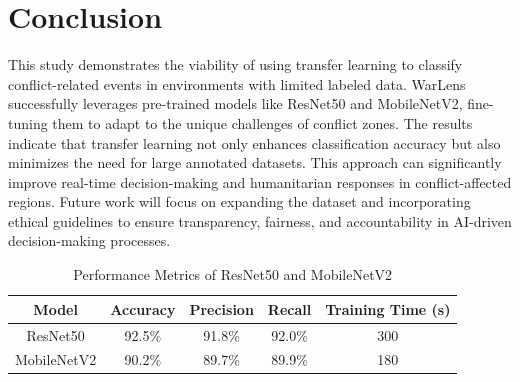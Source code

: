 \documentclass[conference]{IEEEtran}
\begin{document}
\section{Conclusion}
This study demonstrates the viability of using transfer learning to classify conflict-related events in environments with limited labeled data. WarLens successfully leverages pre-trained models like ResNet50 and MobileNetV2, fine-tuning them to adapt to the unique challenges of conflict zones. The results indicate that transfer learning not only enhances classification accuracy but also minimizes the need for large annotated datasets. This approach can significantly improve real-time decision-making and humanitarian responses in conflict-affected regions. Future work will focus on expanding the dataset and incorporating ethical guidelines to ensure transparency, fairness, and accountability in AI-driven decision-making processes.

\begin{table}[h]
\centering
\caption{Performance Metrics of ResNet50 and MobileNetV2}
\begin{tabular}{|c|c|c|c|c|}
\hline
\textbf{Model}     & \textbf{Accuracy} & \textbf{Precision} & \textbf{Recall} & \textbf{Training Time (s)} \\ \hline
ResNet50           & 92.5\%            & 91.8\%             & 92.0\%          & 300                        \\ \hline
MobileNetV2        & 90.2\%            & 89.7\%             & 89.9\%          & 180                        \\ \hline
\end{tabular}
\label{tab:performance_metrics}
\end{table}
\end{document}
